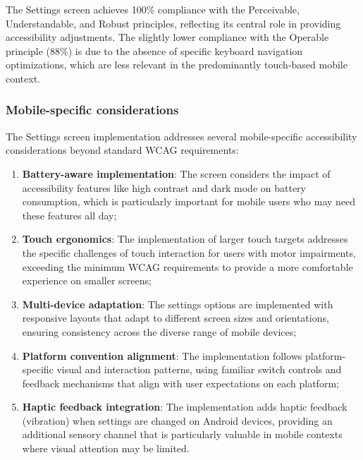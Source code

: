 \FloatBarrier

The Settings screen achieves 100\% compliance with the Perceivable, Understandable, and Robust principles, reflecting its central role in providing accessibility adjustments. The slightly lower compliance with the Operable principle (88\%) is due to the absence of specific keyboard navigation optimizations, which are less relevant in the predominantly touch-based mobile context.

\subsubsection{Mobile-specific considerations}

The Settings screen implementation addresses several mobile-specific accessibility considerations beyond standard WCAG requirements:

\begin{enumerate}
    \item \textbf{Battery-aware implementation}: The screen considers the impact of accessibility features like high contrast and dark mode on battery consumption, which is particularly important for mobile users who may need these features all day;
    
    \item \textbf{Touch ergonomics}: The implementation of larger touch targets addresses the specific challenges of touch interaction for users with motor impairments, exceeding the minimum WCAG requirements to provide a more comfortable experience on smaller screens;
    
    \item \textbf{Multi-device adaptation}: The settings options are implemented with responsive layouts that adapt to different screen sizes and orientations, ensuring consistency across the diverse range of mobile devices;
    
    \item \textbf{Platform convention alignment}: The implementation follows platform-specific visual and interaction patterns, using familiar switch controls and feedback mechanisms that align with user expectations on each platform;
    
    \item \textbf{Haptic feedback integration}: The implementation adds haptic feedback (vibration) when settings are changed on Android devices, providing an additional sensory channel that is particularly valuable in mobile contexts where visual attention may be limited.
\end{enumerate}

